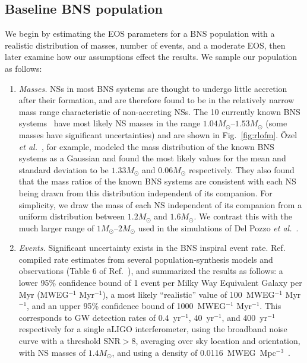 \documentclass[twocolumn,prd,amssymb,aps,nofootinbib,showpacs,epsf]{revtex4}
\begin{document}
\subsection{Baseline BNS population}
\label{sec:baseline}

We begin by estimating the EOS parameters for a BNS population with a realistic distribution of masses, number of events, and a moderate EOS, then later examine how our assumptions effect the results. We sample our population as follows:
\begin{enumerate}
\item \textit{Masses.} NSs in most BNS systems are thought to undergo little accretion after their formation, and are therefore found to be in the relatively narrow mass range characteristic of non-accreting NSs. The 10 currently known BNS systems~\cite{Lattimer2012} have most likely NS masses in the range $1.04M_\odot$--$1.53M_\odot$ (some masses have significant uncertainties) and are shown in Fig.~\ref{fig:rlofm}. \"Ozel {\it et al.}~\cite{OzelPsaltisNarayan2012}, for example, modeled the mass distribution of the known BNS systems as a Gaussian and found the most likely values for the mean and standard deviation to be $1.33M_\odot$ and $0.06M_\odot$ respectively. They also found that the mass ratios of the known BNS systems are consistent with each NS being drawn from this distribution independent of its companion. For simplicity, we draw the mass of each NS independent of its companion from a uniform distribution between $1.2M_\odot$ and $1.6M_\odot$. We contrast this with the much larger range of $1M_\odot$--$2M_\odot$ used in the simulations of Del Pozzo {\it et al.}~\cite{DelPozzoLiAgathos2013}. 

\item \textit{Events.} Significant uncertainty exists in the BNS inspiral event rate. Ref.~\cite{LIGORate2010} compiled rate estimates from several population-synthesis models and observations (Table 6 of Ref.~\cite{LIGORate2010}), and summarized the results as follows: a lower 95\% confidence bound of 1 event per Milky Way Equivalent Galaxy per Myr (MWEG$^{-1}$ Myr$^{-1}$), a most likely ``realistic'' value of 100~MWEG$^{-1}$ Myr$^{-1}$, and an upper 95\% confidence bound of 1000~MWEG$^{-1}$ Myr$^{-1}$. This corresponds to GW detection rates of 0.4~yr$^{-1}$, 40~yr$^{-1}$, and 400~yr$^{-1}$ respectively for a single aLIGO interferometer, using the broadband noise curve with a threshold $\text{SNR} > 8$, averaging over sky location and orientation, with NS masses of $1.4M_\odot$, and using a density of 0.0116~MWEG~Mpc$^{-3}$~\cite{LIGORate2010}. 


\end{enumerate}
\end{document}
